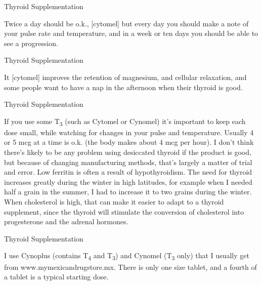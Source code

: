 \documentclass[11pt,oneside,openany,extrafontsizes]{memoir}
\begin{document}
\begin{standalonequote}{Thyroid Supplementation}

    \begin{answer}
        Twice a day should be o.k., [cytomel] but every day you should make a note of your pulse rate and temperature, and in a week or ten days you should be able to see a progression.
    \end{answer}
\end{standalonequote}

\begin{standalonequote}{Thyroid Supplementation}

    \begin{answer}
        It [cytomel] improves the retention of magnesium, and cellular relaxation, and some people want to have a nap in the afternoon when their thyroid is good.
    \end{answer}
\end{standalonequote}

\begin{standalonequote}{Thyroid Supplementation}

    \begin{answer}
        If you use some T\textsubscript{3} (such as Cytomel or Cynomel) it's important to keep each dose small, while watching for changes in your pulse and temperature. Usually 4 or 5 mcg at a time is o.k. (the body makes about 4 mcg per hour). I don't think there's likely to be any problem using desiccated thyroid if the product is good, but because of changing manufacturing methods, that's largely a matter of trial and error. Low ferritin is often a result of hypothyroidism. The need for thyroid increases greatly during the winter in high latitudes, for example when I needed half a grain in the summer, I had to increase it to two grains during the winter. When cholesterol is high, that can make it easier to adapt to a thyroid supplement, since the thyroid will stimulate the conversion of cholesterol into progesterone and the adrenal hormones.
    \end{answer}
\end{standalonequote}

\begin{standalonequote}{Thyroid Supplementation}

    \begin{answer}
        I use Cynoplus (contains T\textsubscript{4} and T\textsubscript{3}) and Cynomel (T\textsubscript{3} only) that I usually get from www.mymexicandrugstore.mx. There is only one size tablet, and a fourth of a tablet is a typical starting dose.
    \end{answer}
\end{standalonequote}
\end{document}
